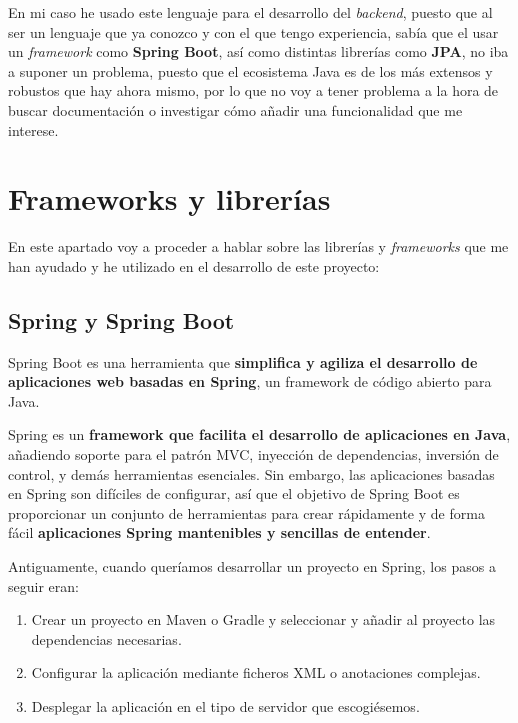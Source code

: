  En mi caso he usado este lenguaje para el desarrollo del \textit{backend}, puesto que al ser un lenguaje que ya conozco y con el que tengo experiencia, sabía 	que el usar un \textit{framework} como \textbf{Spring Boot}, así como distintas librerías como \textbf{JPA}, no iba a suponer un problema, puesto que el ecosistema Java es de los más extensos y robustos que hay ahora mismo, por lo que no voy a tener problema a la hora de buscar documentación o investigar cómo añadir una funcionalidad que me interese.

\section{Frameworks y librerías}

En este apartado voy a proceder a hablar sobre las librerías y \textit{frameworks} que me han ayudado y he utilizado en el desarrollo de este proyecto:

\subsection{Spring y Spring Boot}

Spring Boot es una herramienta que \textbf{simplifica y agiliza el desarrollo de aplicaciones web basadas en Spring}, un framework de código abierto para Java.

Spring es un \textbf{framework que facilita el desarrollo de aplicaciones en Java}, añadiendo soporte para el patrón MVC, inyección de dependencias, inversión de control, y demás herramientas esenciales. Sin embargo, las aplicaciones basadas en Spring son difíciles de configurar, así que el objetivo de Spring Boot es proporcionar un conjunto de herramientas para crear rápidamente y de forma fácil \textbf{aplicaciones Spring mantenibles y sencillas de entender}. \cite{spring:spring-boot}

Antiguamente, cuando queríamos desarrollar un proyecto en Spring, los pasos a seguir eran: 

\begin{enumerate}
  \item Crear un proyecto en Maven o Gradle y seleccionar y añadir al proyecto las dependencias necesarias.
  \item Configurar la aplicación mediante ficheros XML o anotaciones complejas.
  \item Desplegar la aplicación en el tipo de servidor que escogiésemos.
\end{enumerate}

